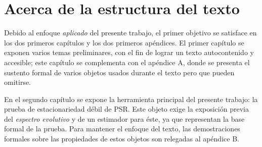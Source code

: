 \documentclass[12pt,letterpaper]{book}
\begin{document}

%

%


\section*{Acerca de la estructura del texto}

Debido al enfoque \textit{aplicado} del presente trabajo, el primer objetivo se satisface en los dos primeros capítulos y los dos primeros apéndices.
%
El primer capítulo se exponen varios temas preliminares, con el fin de lograr un texto autocontenido y accesible; este capítulo se complementa con el apéndice A, donde se presenta el sustento formal de varios objetos usados durante el texto pero que pueden omitirse.
%


En el segundo capítulo se expone la herramienta principal del presente trabajo: la prueba de estacionariedad débil de PSR.
%
Este objeto exige la exposición previa del \textit{espectro evolutivo} y de un estimador para éste, ya que representan la base formal de la prueba.
%
Para mantener el enfoque del texto, las demostraciones formales sobre las propiedades de estos objetos son relegadas al apéndice B.

\end{document}
